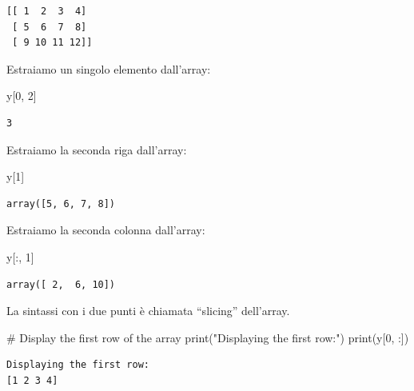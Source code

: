 \documentclass[
  letterpaper,
  krantz2]{{[}./krantz{]}}
\newenvironment{Shaded}{\begin{snugshade}}{\end{snugshade}}
\newcommand{\BuiltInTok}[1]{\textcolor[rgb]{0.00,0.23,0.31}{#1}}
\newcommand{\CommentTok}[1]{\textcolor[rgb]{0.37,0.37,0.37}{#1}}
\newcommand{\DecValTok}[1]{\textcolor[rgb]{0.68,0.00,0.00}{#1}}
\newcommand{\NormalTok}[1]{\textcolor[rgb]{0.00,0.23,0.31}{#1}}
\newcommand{\StringTok}[1]{\textcolor[rgb]{0.13,0.47,0.30}{#1}}
\begin{document}
\begin{verbatim}
[[ 1  2  3  4]
 [ 5  6  7  8]
 [ 9 10 11 12]]
\end{verbatim}

Estraiamo un singolo elemento dall'array:

\begin{Shaded}
\begin{Highlighting}[]
\NormalTok{y[}\DecValTok{0}\NormalTok{, }\DecValTok{2}\NormalTok{]}
\end{Highlighting}
\end{Shaded}

\begin{verbatim}
3
\end{verbatim}

Estraiamo la seconda riga dall'array:

\begin{Shaded}
\begin{Highlighting}[]
\NormalTok{y[}\DecValTok{1}\NormalTok{]}
\end{Highlighting}
\end{Shaded}

\begin{verbatim}
array([5, 6, 7, 8])
\end{verbatim}

Estraiamo la seconda colonna dall'array:

\begin{Shaded}
\begin{Highlighting}[]
\NormalTok{y[:, }\DecValTok{1}\NormalTok{] }
\end{Highlighting}
\end{Shaded}

\begin{verbatim}
array([ 2,  6, 10])
\end{verbatim}

La sintassi con i due punti è chiamata ``slicing'' dell'array.

\begin{Shaded}
\begin{Highlighting}[]
\CommentTok{\# Display the first row of the array}
\BuiltInTok{print}\NormalTok{(}\StringTok{"Displaying the first row:"}\NormalTok{)}
\BuiltInTok{print}\NormalTok{(y[}\DecValTok{0}\NormalTok{, :])}
\end{Highlighting}
\end{Shaded}

\begin{verbatim}
Displaying the first row:
[1 2 3 4]
\end{verbatim}
\end{document}
